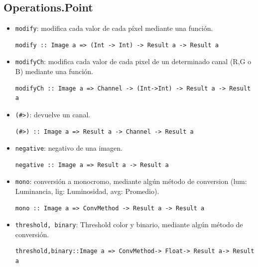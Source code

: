 \documentclass[a4paper, 11pt]{article} %
\begin{document}

\subsection*{Operations.Point}
	\begin{itemize} 
		\item \texttt{modify}: modifica cada valor de cada píxel mediante una función.
\begin{lstlisting} 
modify :: Image a => (Int -> Int) -> Result a -> Result a
\end{lstlisting}
		\item \texttt{modifyCh}: modifica cada valor de cada pixel de un determinado canal (R,G o B) mediante una función.
\begin{lstlisting} 
modifyCh :: Image a => Channel -> (Int->Int) -> Result a -> Result a
\end{lstlisting}
		\item \texttt{(\#>)}: devuelve un canal.
\begin{lstlisting} 
(#>) :: Image a => Result a -> Channel -> Result a
\end{lstlisting}
		\item \texttt{negative}: negativo de una imagen.
\begin{lstlisting} 
negative :: Image a => Result a -> Result a
\end{lstlisting}
		\item \texttt{mono}: conversión a monocromo, mediante algún método de conversion (lum: Luminancia, lig: Luminosidad, avg: Promedio).
\begin{lstlisting} 
mono :: Image a => ConvMethod -> Result a -> Result a
\end{lstlisting}
		\item \texttt{threshold, binary}: Threshold color y binario, mediante algún método de conversión.
\begin{lstlisting} 
threshold,binary::Image a => ConvMethod-> Float-> Result a-> Result a
\end{lstlisting}

	\end{itemize}	

\end{document}
